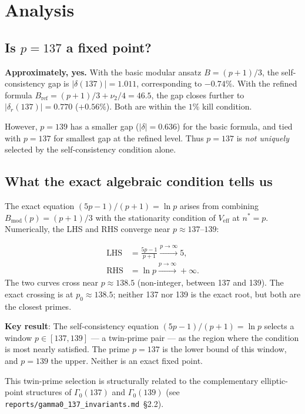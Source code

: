 \documentclass[12pt,a4paper]{article}
\theoremstyle{definition}
\theoremstyle{remark}
\newcommand{\Veff}{V_{\mathrm{eff}}}
\begin{document}
\section{Analysis}
\label{sec:sc:analysis}

\subsection{Is $p=137$ a fixed point?}

\textbf{Approximately, yes.}  With the basic modular ansatz $B = (p+1)/3$,
the self-consistency gap is $|\delta(137)| = 1.011$, corresponding to $-0.74\%$.
With the refined formula $B_{\mathrm{ref}} = (p+1)/3 + \nu_2/4 = 46.5$, the
gap closes further to $|\delta_r(137)| = 0.770$ ($+0.56\%$).  Both are within
the $1\%$ kill condition.

However, $p=139$ has a smaller gap ($|\delta|=0.636$) for the basic formula,
and tied with $p=137$ for smallest gap at the refined level.  Thus $p=137$ is
\emph{not uniquely} selected by the self-consistency condition alone.

\subsection{What the exact algebraic condition tells us}

The exact equation $(5p-1)/(p+1) = \ln p$ arises from combining
$B_{\mathrm{mod}}(p) = (p+1)/3$ with the stationarity condition of
$\Veff$ at $n^* = p$.  Numerically, the LHS and RHS converge near
$p \approx 137$--$139$:

\begin{align}
  \text{LHS} &= \frac{5p-1}{p+1} \xrightarrow{p\to\infty} 5 , \\
  \text{RHS} &= \ln p \xrightarrow{p\to\infty} +\infty .
\end{align}
The two curves cross near $p \approx 138.5$ (non-integer, between 137 and 139).
The exact crossing is at $p_0 \approx 138.5$; neither 137 nor 139 is the exact
root, but both are the closest primes.

\begin{insightbox}
\textbf{Key result}: The self-consistency equation $(5p-1)/(p+1) = \ln p$
selects a window $p \in [137, 139]$ — a twin-prime pair — as the region where
the condition is most nearly satisfied.  The prime $p = 137$ is the lower bound
of this window, and $p = 139$ the upper.  Neither is an exact fixed point.

This twin-prime selection is structurally related to the complementary
elliptic-point structures of $\Gamma_0(137)$ and $\Gamma_0(139)$ (see
\texttt{reports/gamma0\_137\_invariants.md}~\S{}2.2).
\end{insightbox}
\end{document}
